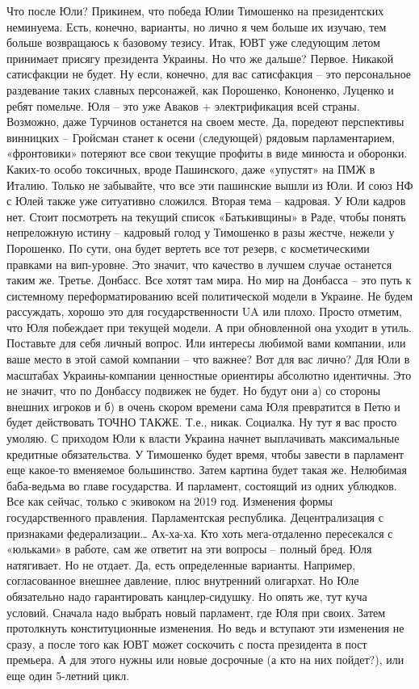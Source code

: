 Что после Юли?
Прикинем, что победа Юлии Тимошенко на президентских неминуема. Есть, конечно, варианты, но лично я чем больше их изучаю, тем больше возвращаюсь к базовому тезису. Итак, ЮВТ уже следующим летом принимает присягу президента Украины. Но что же дальше?
Первое. Никакой сатисфакции не будет. Ну если, конечно, для вас сатисфакция – это персональное раздевание таких славных персонажей, как Порошенко, Кононенко, Луценко и ребят помельче. Юля – это уже Аваков + электрификация всей страны. Возможно, даже Турчинов останется на своем месте. Да, поредеют перспективы винницких – Гройсман станет к осени (следующей) рядовым парламентарием, «фронтовики» потеряют все свои текущие профиты в виде минюста и оборонки. Каких-то особо токсичных, вроде Пашинского, даже «упустят» на ПМЖ в Италию. Только не забывайте, что все эти пашинские вышли из Юли. И союз НФ с Юлей также уже ситуативно сложился.
Вторая тема – кадровая. У Юли кадров нет. Стоит посмотреть на текущий список «Батькивщины» в Раде, чтобы понять непреложную истину – кадровый голод у Тимошенко в разы жестче, нежели у Порошенко. По сути, она будет вертеть все тот резерв, с косметическими правками на вип-уровне. Это значит, что качество в лучшем случае останется таким же.
Третье. Донбасс. Все хотят там мира. Но мир на Донбасса – это путь к системному переформатированию всей политической модели в Украине. Не будем рассуждать, хорошо это для государственности UA или плохо. Просто отметим, что Юля побеждает при текущей модели. А при обновленной она уходит в утиль. Поставьте для себя личный вопрос. Или интересы любимой вами компании, или ваше место в этой самой компании – что важнее? Вот для вас лично? Для Юли в масштабах Украины-компании ценностные ориентиры абсолютно идентичны.
Это не значит, что по Донбассу подвижек не будет. Но будут они а) со стороны внешних игроков и б) в очень скором времени сама Юля превратится в Петю и будет действовать ТОЧНО ТАКЖЕ. Т.е., никак.
Социалка. Ну тут я вас просто умоляю. С приходом Юли к власти Украина начнет выплачивать максимальные кредитные обязательства. У Тимошенко будет время, чтобы завести в парламент еще какое-то вменяемое большинство. Затем картина будет такая же. Нелюбимая баба-ведьма во главе государства. И парламент, состоящий из одних ублюдков. Все как сейчас, только с экивоком на 2019 год.
Изменения формы государственного правления. Парламентская республика. Децентрализация с признаками федерализации… Ах-ха-ха. Кто хоть мега-отдаленно пересекался с «юльками» в работе, сам же ответит на эти вопросы – полный бред. Юля натягивает. Но не отдает. Да, есть определенные варианты. Например, согласованное внешнее давление, плюс внутренний олигархат. Но Юле обязательно надо гарантировать канцлер-сидушку. Но опять же, тут куча условий. Сначала надо выбрать новый парламент, где Юля при своих. Затем протолкнуть конституционные изменения. Но ведь и вступают эти изменения не сразу, а после того как ЮВТ может соскочить с поста президента в пост премьера. А для этого нужны или новые досрочные (а кто на них пойдет?), или еще один 5-летний цикл.
